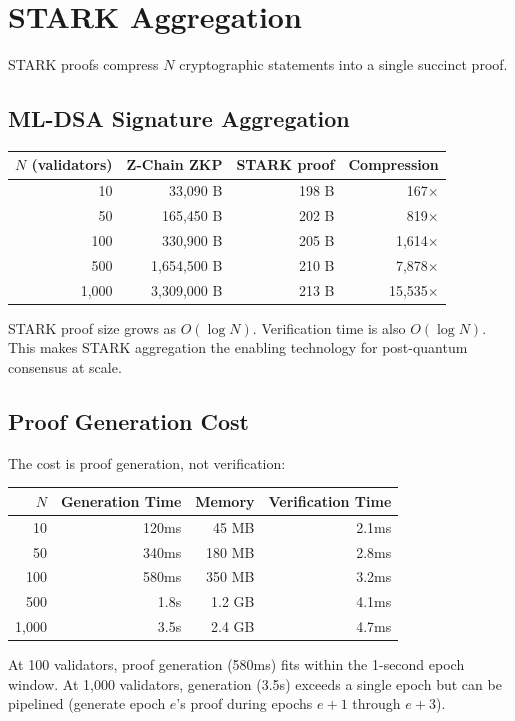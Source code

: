 \section{STARK Aggregation}


STARK proofs compress $N$ cryptographic statements into a single succinct proof.

\subsection{ML-DSA Signature Aggregation}

\begin{center}
\begin{tabular}{rrrr}
\toprule
\textbf{$N$ (validators)} & \textbf{Z-Chain ZKP} & \textbf{STARK proof} & \textbf{Compression} \\
\midrule
10 & 33,090 B & 198 B & 167$\times$ \\
50 & 165,450 B & 202 B & 819$\times$ \\
100 & 330,900 B & 205 B & 1,614$\times$ \\
500 & 1,654,500 B & 210 B & 7,878$\times$ \\
1,000 & 3,309,000 B & 213 B & 15,535$\times$ \\
\bottomrule
\end{tabular}
\end{center}

\begin{observation}
STARK proof size grows as $O(\log N)$. Verification time is also $O(\log N)$. This makes STARK aggregation the enabling technology for post-quantum consensus at scale.
\end{observation}

\subsection{Proof Generation Cost}

The cost is proof generation, not verification:

\begin{center}
\begin{tabular}{rrrr}
\toprule
\textbf{$N$} & \textbf{Generation Time} & \textbf{Memory} & \textbf{Verification Time} \\
\midrule
10 & 120ms & 45 MB & 2.1ms \\
50 & 340ms & 180 MB & 2.8ms \\
100 & 580ms & 350 MB & 3.2ms \\
500 & 1.8s & 1.2 GB & 4.1ms \\
1,000 & 3.5s & 2.4 GB & 4.7ms \\
\bottomrule
\end{tabular}
\end{center}

At 100 validators, proof generation (580ms) fits within the 1-second epoch window. At 1,000 validators, generation (3.5s) exceeds a single epoch but can be pipelined (generate epoch $e$'s proof during epochs $e+1$ through $e+3$).

